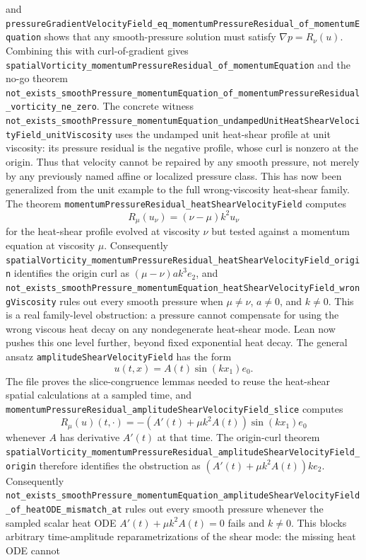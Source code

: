\documentclass[11pt]{article}
\begin{document}
and
\texttt{pressureGradientVelocityField\_eq\_momentumPressureResidual\_of\_momentumEquation}
shows that any smooth-pressure solution must satisfy
\(\nabla p=R_\nu(u)\).  Combining this with curl-of-gradient gives
\texttt{spatialVorticity\_momentumPressureResidual\_of\_momentumEquation} and
the no-go theorem
\texttt{not\_exists\_smoothPressure\_momentumEquation\_of\_momentumPressureResidual\_vorticity\_ne\_zero}.
The concrete witness
\texttt{not\_exists\_smoothPressure\_momentumEquation\_undampedUnitHeatShearVelocityField\_unitViscosity}
uses the undamped unit heat-shear profile at unit viscosity: its pressure
residual is the negative profile, whose curl is nonzero at the origin.  Thus
that velocity cannot be repaired by any smooth pressure, not merely by any
previously named affine or localized pressure class.
This has now been generalized from the unit example to the full wrong-viscosity
heat-shear family.  The theorem
\texttt{momentumPressureResidual\_heatShearVelocityField} computes
\[
  R_\mu(u_\nu)=(\nu-\mu)k^2u_\nu
\]
for the heat-shear profile evolved at viscosity \(\nu\) but tested against a
momentum equation at viscosity \(\mu\).  Consequently
\texttt{spatialVorticity\_momentumPressureResidual\_heatShearVelocityField\_origin}
identifies the origin curl as
\((\mu-\nu)ak^3e_2\), and
\texttt{not\_exists\_smoothPressure\_momentumEquation\_heatShearVelocityField\_wrongViscosity}
rules out every smooth pressure when \(\mu\neq\nu\), \(a\neq0\), and \(k\neq0\).
This is a real family-level obstruction: a pressure cannot compensate for using
the wrong viscous heat decay on any nondegenerate heat-shear mode.
Lean now pushes this one level further, beyond fixed exponential heat decay.
The general ansatz
\texttt{amplitudeShearVelocityField} has the form
\[
  u(t,x)=A(t)\sin(kx_1)e_0 .
\]
The file proves the slice-congruence lemmas needed to reuse the heat-shear
spatial calculations at a sampled time, and
\texttt{momentumPressureResidual\_amplitudeShearVelocityField\_slice}
computes
\[
  R_\mu(u)(t,\cdot)=-(A'(t)+\mu k^2A(t))\sin(kx_1)e_0
\]
whenever \(A\) has derivative \(A'(t)\) at that time.  The origin-curl theorem
\texttt{spatialVorticity\_momentumPressureResidual\_amplitudeShearVelocityField\_origin}
therefore identifies the obstruction as
\((A'(t)+\mu k^2A(t))ke_2\).  Consequently
\texttt{not\_exists\_smoothPressure\_momentumEquation\_amplitudeShearVelocityField\_of\_heatODE\_mismatch\_at}
rules out every smooth pressure whenever the sampled scalar heat ODE
\(A'(t)+\mu k^2A(t)=0\) fails and \(k\neq0\).  This blocks arbitrary
time-amplitude reparametrizations of the shear mode: the missing heat ODE cannot
\end{document}
